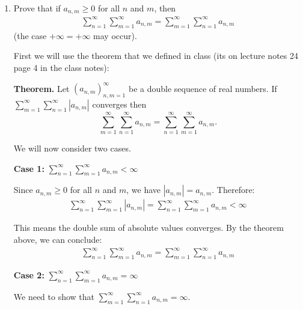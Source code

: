 \documentclass [10pt]{article}
\newcommand{\jg}[1]{{\color{blue} #1}}
\begin{document}
\begin{enumerate}
{}

\clearpage
\item
Prove that if $a_{n, m} \geq 0$ for all $n$ and $m$, then
\begin{align*}
\sum_{n=1}^{\infty} \sum_{m=1}^{\infty} a_{n, m}=\sum_{m=1}^{\infty} \sum_{n=1}^{\infty} a_{n, m}
\end{align*}
(the case $+\infty=+\infty$ may occur).


\jg{

First we will use the theorem that we defined in class (its on lecture notes 24 page 4 in the class notes): 

\textbf{Theorem.} Let $(a_{n,m})_{n,m = 1}^\infty$ be a double sequence of real numbers.
If $\sum_{m=1}^{\infty} \sum_{n=1}^{\infty} |a_{n,m}|$ converges then
$$\sum_{m=1}^{\infty} \sum_{n=1}^{\infty} a_{n,m} = \sum_{n=1}^{\infty} \sum_{m=1}^{\infty} a_{n,m}.$$

We will now consider two cases.

\textbf{Case 1:} $\sum_{n=1}^{\infty} \sum_{m=1}^{\infty} a_{n, m} < \infty$ 

Since $a_{n,m} \geq 0$ for all $n$ and $m$, we have $|a_{n,m}| = a_{n,m}$. Therefore:
\begin{align*}
\sum_{n=1}^{\infty} \sum_{m=1}^{\infty} |a_{n,m}| = \sum_{n=1}^{\infty} \sum_{m=1}^{\infty} a_{n,m} < \infty
\end{align*}

This means the double sum of absolute values converges. By the theorem above, we can conclude:
\begin{align*}
\sum_{n=1}^{\infty} \sum_{m=1}^{\infty} a_{n,m} = \sum_{m=1}^{\infty} \sum_{n=1}^{\infty} a_{n,m}
\end{align*}

\textbf{Case 2:} $\sum_{n=1}^{\infty} \sum_{m=1}^{\infty} a_{n, m} = \infty$ 

We need to show that $\sum_{m=1}^{\infty} \sum_{n=1}^{\infty} a_{n, m} = \infty$.

}
\end{enumerate}
\end{document}
